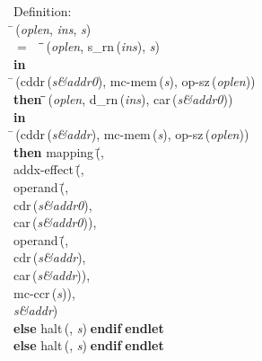 \begin{tabbing}{\sc Definition}: \\  
\=\,({\it{oplen\/}}, {\it{ins\/}}, {\it{s\/}}) \\ 
$=$$\;\;\;\;$\=\=\,({\it{oplen\/}}, {\rm{s\_rn}}\,({\it{ins\/}}), {\it{s\/}})\- \\ 
{\bf in} \\ 
\=\,({\rm{cddr}}\,({\it{s\&addr0\/}}), {\rm{mc-mem}}\,({\it{s\/}}), {\rm{op-sz}}\,({\it{oplen\/}})) \\ 
{\bf then }\=\=\,({\it{oplen\/}}, {\rm{d\_rn}}\,({\it{ins\/}}), {\rm{car}}\,({\it{s\&addr0\/}}))\- \\ 
{\bf in} \\ 
\=\,({\rm{cddr}}\,({\it{s\&addr\/}}), {\rm{mc-mem}}\,({\it{s\/}}), {\rm{op-sz}}\,({\it{oplen\/}})) \\ 
{\bf then }{\rm{mapping}}\,(\=, \\ 
{\rm{addx-effect}}\,(\=, \\ 
{\rm{operand}}\,(\=, \\ 
{\rm{cdr}}\,({\it{s\&addr0\/}}), \\ 
{\rm{car}}\,({\it{s\&addr0\/}}))\-, \\ 
{\rm{operand}}\,(\=, \\ 
{\rm{cdr}}\,({\it{s\&addr\/}}), \\ 
{\rm{car}}\,({\it{s\&addr\/}}))\-, \\ 
{\rm{mc-ccr}}\,({\it{s\/}}))\-, \\ 
{\it{s\&addr\/}})\- \\ 
{\bf else }{\rm{halt}}\,({}, {\it{s\/}})$\;${\bf  endif}\-$\;${\bf  endlet}\- \\ 
{\bf else }{\rm{halt}}\,({}, {\it{s\/}})$\;${\bf  endif}\-$\;${\bf  endlet}\-\-
\end{tabbing}

